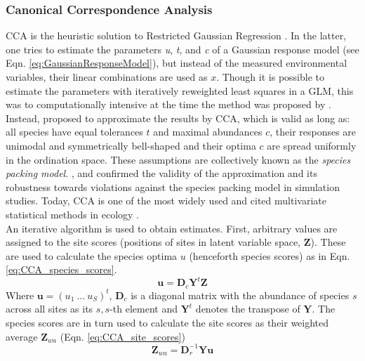 \documentclass[a4paper,11pt]{article}
\begin{document}
	\subsubsection{Canonical Correspondence Analysis}
	 CCA is the heuristic solution to Restricted Gaussian Regression \citep{Zuur2007}. 
	 In the latter, one tries to estimate the parameters \textit{u}, \textit{t}, and \textit{c} of a Gaussian response model (see Eqn. \ref{eq:GaussianResponseModel}), but instead of the measured environmental variables, their linear combinations are used as $x$. 
	 Though it is possible to estimate the parameters with iteratively reweighted least squares in a GLM, this was to computationally intensive at the time the method was proposed by  \citet{GauchJr1972}.
	 Instead, \citep{TerBraak1986} proposed to approximate the results by CCA, which is valid as long as: all species have equal tolerances $t$ and maximal abundances $c$, their responses are unimodal and symmetrically bell-shaped and their optima $c$ are spread uniformly in the ordination space. 
	 These assumptions are collectively known as the \textit{species packing model}.
	 \citet{Palmer1993}, \citet{Johnson1999} and \citet{Zuur1999} confirmed the validity of the approximation and its robustness towards violations against the species packing model in simulation studies.
	 Today, CCA is one of the most widely used and cited multivariate statistical methods in ecology \citep{Braak2014}.\\
		An iterative algorithm is used to obtain estimates. 
		First, arbitrary values are assigned to the site scores (positions of sites in latent variable space, $\mathbf{Z}$). 
		These are used to calculate the species optima $u$ (henceforth species scores) as in Eqn. \ref{eq:CCA_species_scores}.
		\begin{equation}\label{eq:CCA_species_scores}
		\mathbf{u} = \mathbf{D}_c \mathbf{Y}^t \mathbf {Z}
		\end{equation}
		Where $\mathbf{u} = (u_1\ ...\ u_S)^t$, $\mathbf{D}_c$ is a diagonal matrix with the abundance of species $s$ across all sites as its $s,s$-th element and $\mathbf{Y}^t$ denotes the transpose of $\mathbf{Y}$.
		The species scores are in turn used to calculate the site scores as their weighted average $\mathbf{Z}_{wa}$ (Eqn. \ref{eq:CCA_site_scores}) 
		\begin{equation} \label{eq:CCA_site_scores}
			\mathbf{Z}_{wa} = \mathbf{D}_r^{-1} \mathbf{Y} \mathbf {u}
		\end{equation}
\end{document}
